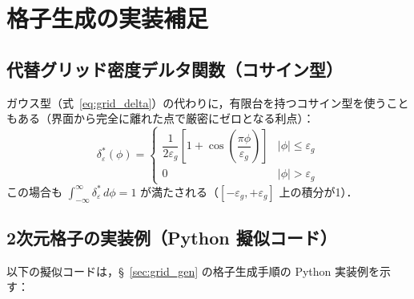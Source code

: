 %

\section{格子生成の実装補足}
\label{app:grid_impl}

\subsection{代替グリッド密度デルタ関数（コサイン型）}
\label{app:grid_delta_cosine}

ガウス型（式~\eqref{eq:grid_delta}）の代わりに，有限台を持つコサイン型を使うこともある（界面から完全に離れた点で厳密にゼロとなる利点）：
\[
  \delta_\varepsilon^*(\phi) =
  \begin{cases}
    \dfrac{1}{2\varepsilon_g}\left[1 + \cos\!\left(\dfrac{\pi\phi}{\varepsilon_g}\right)\right] & |\phi| \le \varepsilon_g \\[6pt]
    0 & |\phi| > \varepsilon_g
  \end{cases}
\]
この場合も $\int_{-\infty}^{\infty}\delta_\varepsilon^*\,d\phi = 1$ が満たされる（$[-\varepsilon_g,+\varepsilon_g]$ 上の積分が1）．

\subsection{2次元格子の実装例（Python 擬似コード）}
\label{app:grid_2d_impl}

以下の擬似コードは，§~\ref{sec:grid_gen} の格子生成手順の Python 実装例を示す：

